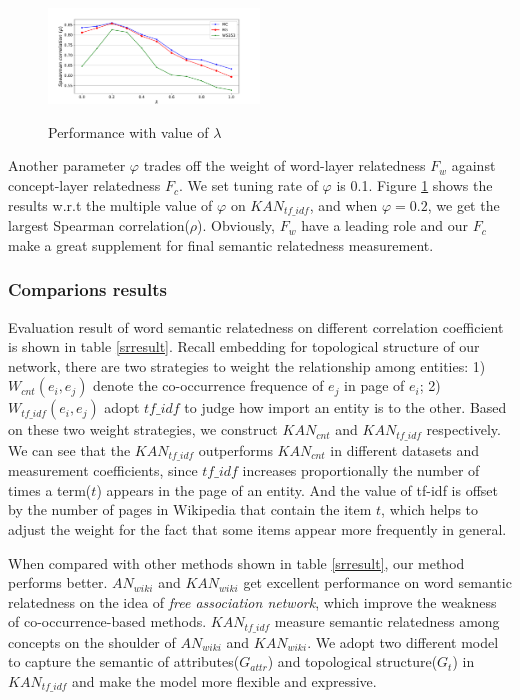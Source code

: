 \begin{figure}
    \flushleft
    \includegraphics[width=0.5\textwidth]{pic/params_lambda.pdf}\\
    \caption{Performance with value of $\lambda$}
    \label{lambda}
\end{figure}


Another parameter $\varphi$ trades off the weight of word-layer
relatedness $F_w$ against concept-layer relatedness $F_c$. We set tuning rate of $\varphi$
is 0.1. Figure \ref{lambda} shows the results w.r.t the multiple value of $\varphi$ on $KAN_{tf\_idf}$, and when
$\varphi=0.2$, we get the largest Spearman correlation($\rho$). Obviously, $F_w$ have a leading role and
our $F_c$ make a great supplement for final semantic relatedness measurement.

\subsubsection{Comparions results}

Evaluation result of word semantic relatedness on different correlation coefficient is shown in table \ref{srresult}.
Recall embedding for topological structure of our network, there are two strategies to weight the relationship among
entities: 1) $W_{cnt}(e_i, e_j)$ denote the co-occurrence frequence of $e_j$ in page of $e_i$; 2) $W_{tf\_idf}(e_i, e_j)$
adopt $tf\_idf$ to judge how import an entity is to the other. Based on these two weight strategies, we construct $KAN_{cnt}$
and $KAN_{tf\_idf}$ respectively.
We can see that the $KAN_{tf\_idf}$ outperforms $KAN_{cnt}$ in different datasets and measurement coefficients,
since $tf\_idf$ increases proportionally the number of times a term($t$) appears in the page of an entity.
And the value of tf-idf is offset by the number of pages in Wikipedia that contain the item $t$, which helps
to adjust the weight for the fact that some items appear more frequently in general.

When compared with other methods shown in table \ref{srresult}, our method performs better.
$AN_{wiki}$ and $KAN_{wiki}$ get excellent performance on word semantic relatedness on the idea of \emph{free association network},
which improve the weakness of co-occurrence-based methods. $KAN_{tf\_idf}$ measure semantic relatedness
among concepts on the shoulder of $AN_{wiki}$ and $KAN_{wiki}$. We adopt two different model to
capture the semantic of attributes($G_{attr}$) and topological structure($G_t$) in $KAN_{tf\_idf}$ and make the
model more flexible and expressive.